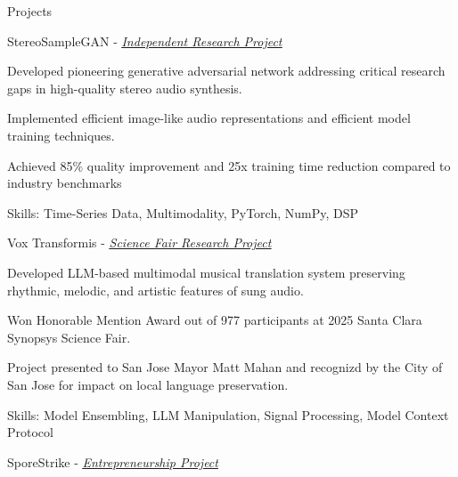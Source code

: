 \documentclass[
  10pt, %
]{resume}
\begin{document}
\begin{rSection}{Projects}

  
    \begin{rSubsection}{StereoSampleGAN - \textit{\underline{\href{https://github.com/shuklabhay/stereo-sample-gan}{Independent Research Project}}}}{}{}{}
        
      \item Developed pioneering generative adversarial network addressing critical research gaps in high-quality stereo audio synthesis.
          
      \item Implemented efficient image-like audio representations and efficient model training techniques.
          
      \item Achieved 85\% quality improvement and 25x training time reduction compared to industry benchmarks
          
      \item Skills: Time-Series Data, Multimodality, PyTorch, NumPy, DSP
          
    \end{rSubsection}
        
    \begin{rSubsection}{Vox Transformis - \textit{\underline{\href{https://shuklabhay.github.io/static/projects/vox-transformis/vt_poster.png}{Science Fair Research Project}}}}{}{}{}
        
      \item Developed LLM-based multimodal musical translation system preserving rhythmic, melodic, and artistic features of sung audio.
          
      \item Won Honorable Mention Award out of 977 participants at 2025 Santa Clara Synopsys Science Fair.
          
      \item Project presented to San Jose Mayor Matt Mahan and recognizd by the City of San Jose for impact on local language preservation.
          
      \item Skills: Model Ensembling, LLM Manipulation, Signal Processing, Model Context Protocol
          
    \end{rSubsection}
        
    \begin{rSubsection}{SporeStrike - \textit{\underline{\href{https://shuklabhay.github.io/static/projects/sporestrike/FlexFactor_SporeStrike_pitch.pdf}{Entrepreneurship Project}}}}{}{}{}
        

\end{rSubsection}
\end{rSection}
\end{document}
